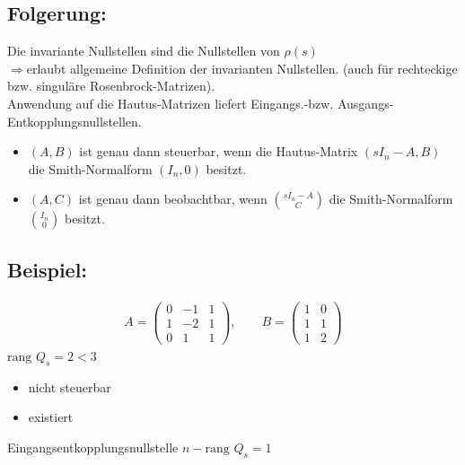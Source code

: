 \documentclass[ngerman]{tudscrreprt}
\begin{document}
\subsection*{Folgerung:} Die invariante Nullstellen sind die Nullstellen von $\rho(s)$\\ 
$\Rightarrow $erlaubt allgemeine Definition der invarianten Nullstellen. (auch für rechteckige bzw. singuläre Rosenbrock-Matrizen). \\
Anwendung auf die Hautus-Matrizen liefert Eingangs.-bzw. Ausgangs-Entkopplungsnullstellen. 
\begin{itemize}
\item $(A,B) $ ist genau dann steuerbar, wenn die Hautus-Matrix $(sI_n - A, B)$ die Smith-Normalform $(I_n, 0)$ besitzt. 
\item $(A,C)$ ist genau dann beobachtbar, wenn $\binom{sI_n - A}{C} $ die Smith-Normalform $\binom{I_n}{0}$ besitzt. 
\end{itemize}
\subsection*{Beispiel:}\begin{align*}A = \begin{pmatrix} 0 & -1 & 1\\ 1 & -2& 1\\ 0 & 1& 1\end{pmatrix},\qquad B = \begin{pmatrix} 1& 0\\ 1&1\\ 1&2\end{pmatrix} \end{align*}
$\text{rang } Q_s = 2<3$ \begin{itemize}\item nicht steuerbar \item existiert \end{itemize}Eingangsentkopplungsnullstelle $n - \text{rang }Q_s = 1$
\end{document}

